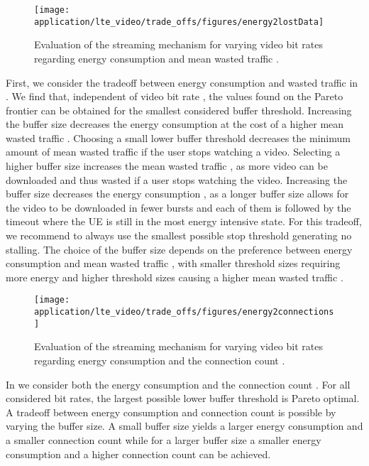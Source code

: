 \begin{figure}
  \centering
  \texttt{[image: application/lte\_video/trade\_offs/figures/energy2lostData]}
  \caption{Evaluation of the streaming mechanism for varying video bit rates \bitrate regarding energy consumption \energyconsumption and mean wasted traffic \meanwastedtraffic.}
  \label{fig:application:lte_video:numerical_evaluation:trade_offs:energy2lostData}
\end{figure}

First, we consider the tradeoff between energy consumption \energyconsumption and wasted traffic in .
We find that, independent of video bit rate \bitrate, the values found on the Pareto frontier can be obtained for the smallest considered buffer threshold.
Increasing the buffer size decreases the energy consumption \energyconsumption at the cost of a higher mean wasted traffic \meanwastedtraffic.
Choosing a small lower buffer threshold \bufferlower decreases the minimum amount of mean wasted traffic \meanwastedtraffic if the user stops watching a video.
Selecting a higher buffer size \buffersize  increases the mean wasted traffic \meanwastedtraffic, as more video can be downloaded and thus wasted if a user stops watching the video.
Increasing the buffer size \buffersize decreases the energy consumption \energyconsumption, as a longer buffer size allows for the video to be downloaded in fewer bursts and each of them is followed by the \tidle timeout where the \gls{UE} is still in the most energy intensive \rrcconnected state.
For this tradeoff, we recommend to always use the smallest possible stop threshold generating no stalling.
The choice of the buffer size depends on the preference between energy consumption \energyconsumption and mean wasted traffic \meanwastedtraffic, with smaller threshold sizes requiring more energy and higher threshold sizes causing a higher mean wasted traffic \meanwastedtraffic.

\begin{figure}
  \centering
  \texttt{[image: application/lte\_video/trade\_offs/figures/energy2connections]}
  \caption{Evaluation of the streaming mechanism for varying video bit rates \bitrate regarding energy consumption \energyconsumption and the connection count \connectioncount.}
  \label{fig:application:lte_video:numerical_evaluation:trade_offs:energy2connections}
\end{figure}

In  we consider both the energy consumption \energyconsumption and the connection count \connectioncount.
For all considered bit rates, the largest possible lower buffer threshold is Pareto optimal.
A tradeoff between energy consumption \energyconsumption and connection count \connectioncount is possible by varying the buffer size.
A small buffer size yields a larger energy consumption \energyconsumption and a smaller connection count \connectioncount while for a larger buffer size a smaller energy consumption \energyconsumption and a higher connection count \connectioncount can be achieved.

